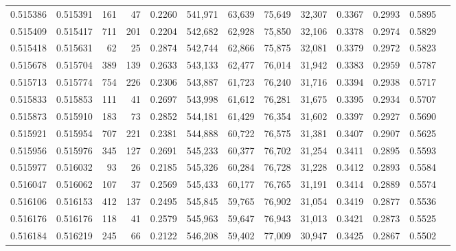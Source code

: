 \begin{tabular}{rrrrrrrrrrrrr}
0.515386 & 0.515391 &   161 &    47 &                                     0.2260 & 541,971 &  63,639 &  75,649 &  32,307 & 0.3367 & 0.2993 & 0.5895 \\
0.515409 & 0.515417 &   711 &   201 &                                     0.2204 & 542,682 &  62,928 &  75,850 &  32,106 & 0.3378 & 0.2974 & 0.5829 \\
0.515418 & 0.515631 &    62 &    25 &                                     0.2874 & 542,744 &  62,866 &  75,875 &  32,081 & 0.3379 & 0.2972 & 0.5823 \\
0.515678 & 0.515704 &   389 &   139 &                                     0.2633 & 543,133 &  62,477 &  76,014 &  31,942 & 0.3383 & 0.2959 & 0.5787 \\
0.515713 & 0.515774 &   754 &   226 &                                     0.2306 & 543,887 &  61,723 &  76,240 &  31,716 & 0.3394 & 0.2938 & 0.5717 \\
0.515833 & 0.515853 &   111 &    41 &                                     0.2697 & 543,998 &  61,612 &  76,281 &  31,675 & 0.3395 & 0.2934 & 0.5707 \\
0.515873 & 0.515910 &   183 &    73 &                                     0.2852 & 544,181 &  61,429 &  76,354 &  31,602 & 0.3397 & 0.2927 & 0.5690 \\
0.515921 & 0.515954 &   707 &   221 &                                     0.2381 & 544,888 &  60,722 &  76,575 &  31,381 & 0.3407 & 0.2907 & 0.5625 \\
0.515956 & 0.515976 &   345 &   127 &                                     0.2691 & 545,233 &  60,377 &  76,702 &  31,254 & 0.3411 & 0.2895 & 0.5593 \\
0.515977 & 0.516032 &    93 &    26 &                                     0.2185 & 545,326 &  60,284 &  76,728 &  31,228 & 0.3412 & 0.2893 & 0.5584 \\
0.516047 & 0.516062 &   107 &    37 &                                     0.2569 & 545,433 &  60,177 &  76,765 &  31,191 & 0.3414 & 0.2889 & 0.5574 \\
0.516106 & 0.516153 &   412 &   137 &                                     0.2495 & 545,845 &  59,765 &  76,902 &  31,054 & 0.3419 & 0.2877 & 0.5536 \\
0.516176 & 0.516176 &   118 &    41 &                                     0.2579 & 545,963 &  59,647 &  76,943 &  31,013 & 0.3421 & 0.2873 & 0.5525 \\
0.516184 & 0.516219 &   245 &    66 &                                     0.2122 & 546,208 &  59,402 &  77,009 &  30,947 & 0.3425 & 0.2867 & 0.5502 \\

\end{tabular}
